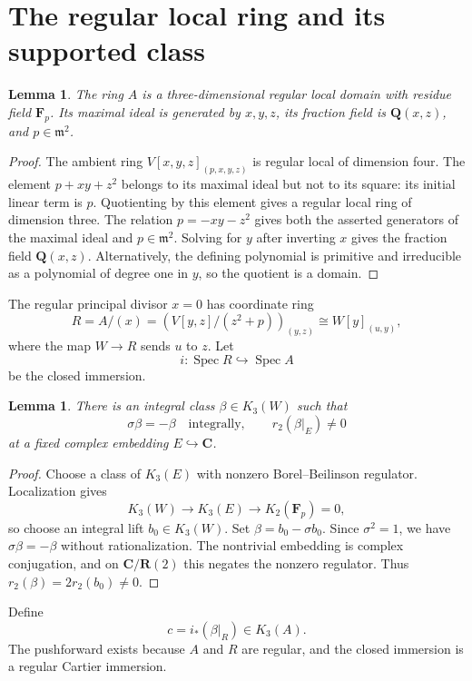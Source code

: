 \documentclass[11pt,a4paper]{article}
\newtheorem{lemma}[theorem]{Lemma}
\theoremstyle{remark}
\newcommand{\Q}{\mathbf Q}
\newcommand{\R}{\mathbf R}
\newcommand{\C}{\mathbf C}
\newcommand{\F}{\mathbf F}
\newcommand{\m}{\mathfrak m}
\newcommand{\Spec}{\operatorname{Spec}}
\begin{document}
\section{The regular local ring and its supported class}

\begin{lemma}\label{lem:regularA}
The ring $A$ is a three-dimensional regular local domain with residue field $\F_p$. Its maximal ideal is generated by $x,y,z$, its fraction field is $\Q(x,z)$, and $p\in\m^2$.
\end{lemma}
\begin{proof}
The ambient ring $V[x,y,z]_{(p,x,y,z)}$ is regular local of dimension four. The element $p+xy+z^2$ belongs to its maximal ideal but not to its square: its initial linear term is $p$. Quotienting by this element gives a regular local ring of dimension three. The relation $p=-xy-z^2$ gives both the asserted generators of the maximal ideal and $p\in\m^2$. Solving for $y$ after inverting $x$ gives the fraction field $\Q(x,z)$. Alternatively, the defining polynomial is primitive and irreducible as a polynomial of degree one in $y$, so the quotient is a domain.
\end{proof}

The regular principal divisor $x=0$ has coordinate ring
\[
R=A/(x)=\left(V[y,z]/(z^2+p)\right)_{(y,z)}
\cong W[y]_{(u,y)},
\]
where the map $W\to R$ sends $u$ to $z$. Let
\[
i:\Spec R\hookrightarrow\Spec A
\]
be the closed immersion.

\begin{lemma}\label{lem:beta}
There is an integral class $\beta\in K_3(W)$ such that
\[
\sigma\beta=-\beta\quad\text{integrally},\qquad r_2(\beta|_E)\neq 0
\]
at a fixed complex embedding $E\hookrightarrow\C$.
\end{lemma}
\begin{proof}
Choose a class of $K_3(E)$ with nonzero Borel--Beilinson regulator. Localization gives
\[
K_3(W)\longrightarrow K_3(E)\longrightarrow K_2(\F_p)=0,
\]
so choose an integral lift $b_0\in K_3(W)$. Set $\beta=b_0-\sigma b_0$. Since $\sigma^2=1$, we have $\sigma\beta=-\beta$ without rationalization. The nontrivial embedding is complex conjugation, and on $\C/\R(2)$ this negates the nonzero regulator. Thus $r_2(\beta)=2r_2(b_0)\neq 0$.
\end{proof}

Define
\begin{equation}\label{eq:c}
c=i_*(\beta|_R)\in K_3(A).
\end{equation}
The pushforward exists because $A$ and $R$ are regular, and the closed immersion is a regular Cartier immersion.
\end{document}
